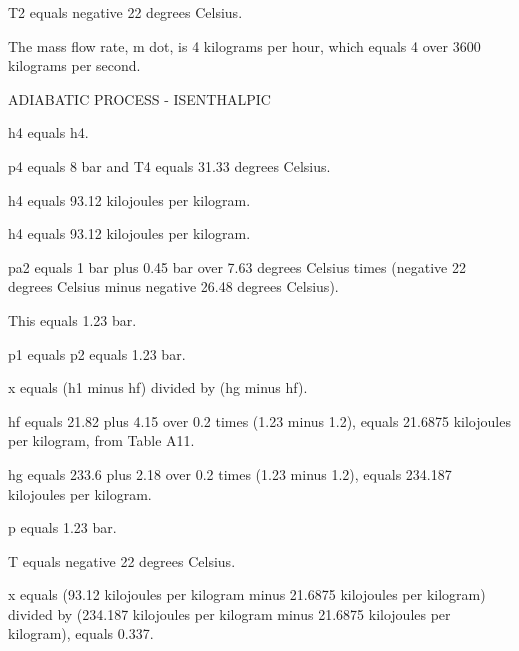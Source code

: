 T2 equals negative 22 degrees Celsius.

The mass flow rate, m dot, is 4 kilograms per hour, which equals 4 over 3600 kilograms per second.

ADIABATIC PROCESS - ISENTHALPIC

h4 equals h4.

p4 equals 8 bar and T4 equals 31.33 degrees Celsius.

h4 equals 93.12 kilojoules per kilogram.

h4 equals 93.12 kilojoules per kilogram.

pa2 equals 1 bar plus 0.45 bar over 7.63 degrees Celsius times (negative 22 degrees Celsius minus negative 26.48 degrees Celsius).

This equals 1.23 bar.

p1 equals p2 equals 1.23 bar.

x equals (h1 minus hf) divided by (hg minus hf).

hf equals 21.82 plus 4.15 over 0.2 times (1.23 minus 1.2), equals 21.6875 kilojoules per kilogram, from Table A11.

hg equals 233.6 plus 2.18 over 0.2 times (1.23 minus 1.2), equals 234.187 kilojoules per kilogram.

p equals 1.23 bar.

T equals negative 22 degrees Celsius.

x equals (93.12 kilojoules per kilogram minus 21.6875 kilojoules per kilogram) divided by (234.187 kilojoules per kilogram minus 21.6875 kilojoules per kilogram), equals 0.337.